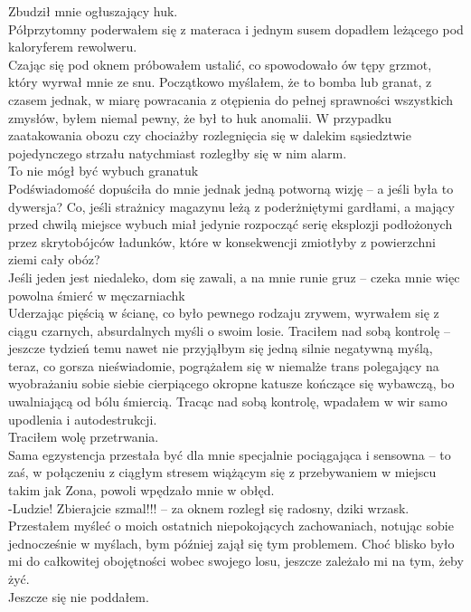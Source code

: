 \documentclass[../MAIN.tex]{subfiles}
\begin{document}
Zbudził mnie ogłuszający huk.\\
Półprzytomny poderwałem się z materaca i jednym susem dopadłem leżącego pod kaloryferem rewolweru.\\
Czając się pod oknem próbowałem ustalić, co spowodowało ów tępy grzmot, który wyrwał mnie ze snu. Początkowo myślałem, że to bomba lub granat, z czasem jednak, w miarę powracania z otępienia do pełnej sprawności wszystkich zmysłów, byłem niemal pewny, że był to huk anomalii. W przypadku zaatakowania obozu czy chociażby rozlegnięcia się w dalekim sąsiedztwie pojedynczego strzału natychmiast rozległby się w nim alarm.\\
To nie mógł być wybuch granatu\3k\\
Podświadomość dopuściła do mnie jednak jedną potworną wizję -- a jeśli była to dywersja? Co, jeśli strażnicy magazynu leżą z poderżniętymi gardłami, a mający przed chwilą miejsce wybuch miał jedynie rozpocząć serię eksplozji podłożonych przez skrytobójców ładunków, które w konsekwencji zmiotłyby z powierzchni ziemi cały obóz?\\
Jeśli jeden jest niedaleko, dom się zawali, a na mnie runie gruz -- czeka mnie więc powolna śmierć w męczarniach\3k\\
Uderzając pięścią w ścianę, co było pewnego rodzaju zrywem, wyrwałem się z ciągu czarnych, absurdalnych myśli o swoim losie. Traciłem nad sobą kontrolę -- jeszcze tydzień temu nawet nie przyjąłbym się jedną silnie negatywną myślą, teraz, co gorsza nieświadomie, pogrążałem się w niemalże trans polegający na wyobrażaniu sobie siebie cierpiącego okropne katusze kończące się wybawczą, bo uwalniającą od bólu śmiercią. Tracąc nad sobą kontrolę, wpadałem w wir samo upodlenia i autodestrukcji.\\
Traciłem wolę przetrwania.\\
Sama egzystencja przestała być dla mnie specjalnie pociągająca i sensowna -- to zaś, w połączeniu z ciągłym stresem wiążącym się z przebywaniem w miejscu takim jak Zona, powoli wpędzało mnie w obłęd.\\
-Ludzie! Zbierajcie szmal!!! -- za oknem rozległ się radosny, dziki wrzask.\\
Przestałem myśleć o moich ostatnich niepokojących zachowaniach, notując sobie jednocześnie w myślach, bym później zajął się tym problemem. Choć blisko było mi do całkowitej obojętności wobec swojego losu, jeszcze zależało mi na tym, żeby żyć.\\
Jeszcze się nie poddałem.\\
\end{document}
